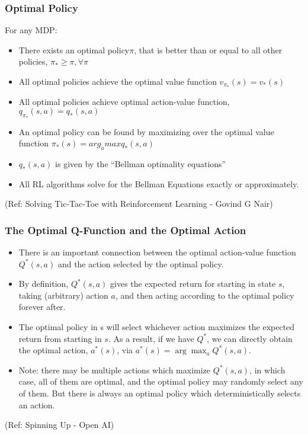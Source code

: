 \begin{frame}[fragile]\frametitle{Optimal Policy}

For any MDP:

\begin{itemize}
\item There exists an optimal policy$\pi$, that is better than or equal to all other policies, $\pi_* \geq \pi, \forall \pi$
\item All optimal policies achieve the optimal value function $v_{\pi_*}(s) = v_*(s)$
\item All optimal policies achieve optimal action-value function,  $q_{\pi_*}(s,a) = q_*(s,a)$
\item An optimal policy can be found by maximizing over the optimal value function $\pi_*(s) = arg_a max q_*(s,a)$
\item  $q_*(s,a)$ is given by the ``Bellman optimality equations''
\item All RL algorithms solve for the Bellman Equations exactly or approximately. 
\end{itemize}



{\tiny (Ref: Solving Tic-Tac-Toe with Reinforcement Learning - Govind G Nair)}

\end{frame}

\begin{frame}[fragile]\frametitle{The Optimal Q-Function and the Optimal Action}

\begin{itemize}
\item There is an important connection between the optimal action-value function $Q^*(s,a)$ and the action selected by the optimal policy. 
\item By definition, $Q^*(s,a)$ gives the expected return for starting in state $s$, taking (arbitrary) action $a$, and then acting according to the optimal policy forever after.
\item The optimal policy in s will select whichever action maximizes the expected return from starting in $s$. As a result, if we have $Q^*$, we can directly obtain the optimal action, $a^*(s)$, via $a^*(s) = \arg \max_a Q^* (s,a)$.
\item Note: there may be multiple actions which maximize $Q^*(s,a)$, in which case, all of them are optimal, and the optimal policy may randomly select any of them. But there is always an optimal policy which deterministically selects an action.
\end{itemize}

{\tiny (Ref: Spinning Up - Open AI)}
\end{frame}


